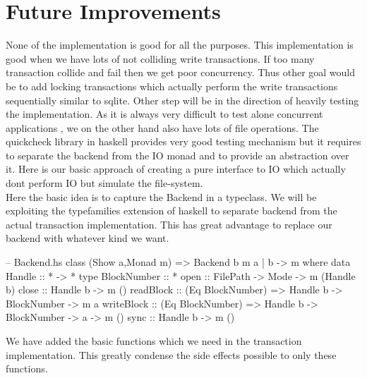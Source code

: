 \documentclass[11pt,a4paper]{article}
\begin{document}
\section{Future Improvements}
None of the implementation is good for all the purposes. This implementation is good when we have lots of not colliding write transactions. If too many transaction collide and fail then we get poor concurrency. Thus other goal would be to add locking transactions which actually perform the write transactions sequentially similar to sqlite. 
Other step will be in the direction of heavily testing the implementation. As it is always very difficult to test alone concurrent applications , we on the other hand also have lots of file operations. The quickcheck library in haskell provides very good testing mechanism but it requires to separate the backend from the IO monad and to provide an abstraction over it.
Here is our basic approach of creating a pure interface to IO which actually dont perform IO but simulate the file-system. \\
Here the basic idea is to capture the Backend in a typeclass. We will be exploiting the typefamilies extension of haskell to separate backend from the actual transaction implementation. This has great advantage to replace our backend with whatever kind we want.\\ 
\begin{code}
-- Backend.hs
class (Show a,Monad m) => Backend b m a | b -> m where 
    data Handle :: * -> * 
    type BlockNumber :: *  
    open :: FilePath -> Mode -> m (Handle b)
    close :: Handle b -> m () 
    readBlock :: (Eq BlockNumber) => Handle b -> BlockNumber -> m a 
    writeBlock :: (Eq BlockNumber) => Handle b -> BlockNumber -> a -> m ()
    sync :: Handle b -> m ()
\end{code}
We have added the basic functions which we need in the transaction implementation. This greatly condense the side effects possible to only these functions.
\end{document}
